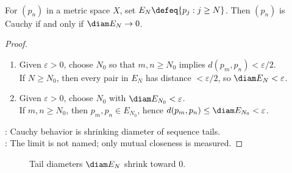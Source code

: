 \begin{proposition} \label{prop:cauchy-tail-diameters} \\
For $(p_n)$ in a metric space $X$, set $E_N\defeq\{p_j:j\geq N\}$. Then $(p_n)$ is Cauchy if and only if $\diam E_N\to0$.
\begin{proof}
\begin{enumerate}[label=\roman*.]
\setlength{\itemsep}{0pt}
\item[$(\Rightarrow)$] Given $\varepsilon>0$, choose $N_0$ so that $m,n\geq N_0$ implies $d(p_m,p_n)<\varepsilon/2$.\\
If $N\geq N_0$, then every pair in $E_N$ has distance $<\varepsilon/2$, so $\diam E_N<\varepsilon$.
\item[$(\Leftarrow)$] Given $\varepsilon>0$, choose $N_0$ with $\diam E_{N_0}<\varepsilon$.\\
If $m,n\geq N_0$, then $p_m,p_n\in E_{N_0}$, hence $d(p_m,p_n)\leq\diam E_{N_0}<\varepsilon$.
\end{enumerate}
: Cauchy behavior is shrinking diameter of sequence tails.\\
: The limit is not named; only mutual closeness is measured.
\end{proof}
\end{proposition}

\begin{figure}[H]
  \centering
  
  \caption{Tail diameters $\diam E_N$ shrink toward $0$.}
  \label{fig:cauchy-tail-diameters}
\end{figure}


